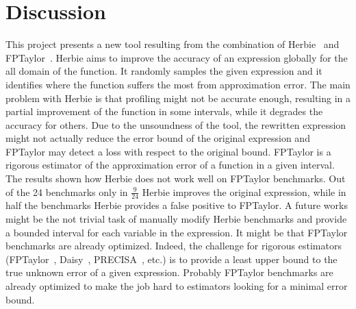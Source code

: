 \documentclass[runningheads]{llncs}
\begin{document}
\section{Discussion}
This project presents a new tool resulting from the combination of Herbie~\cite{herbie} and FPTaylor~\cite{fptaylor}. 
Herbie aims to improve the accuracy of an expression globally for the all domain of the function. It randomly samples the given expression and it identifies where the function suffers the most from approximation error. 
The main problem with Herbie is that profiling might not be accurate enough, resulting in a partial improvement of the function in some intervals, while it degrades the accuracy for others. Due to the unsoundness of the tool, the rewritten expression might not actually reduce the error bound of the original expression and FPTaylor may detect a loss with respect to the original bound. FPTaylor is a rigorous estimator of the approximation error of a function in a given interval.
The results shown how Herbie does not work well on FPTaylor benchmarks. Out of the 24 benchmarks only in $\frac{9}{24}$ Herbie improves the original expression, while in half the benchmarks Herbie provides a false positive to FPTaylor.
A future works might be the not trivial task of manually modify Herbie benchmarks and provide a bounded interval for each variable in the expression. 
It might be that FPTaylor benchmarks are already optimized. Indeed, the challenge for rigorous estimators (FPTaylor~\cite{fptaylor}, Daisy~\cite{Daisy}, PRECISA~\cite{precisa}, etc.) is to provide a least upper bound to the true unknown error of a given expression. Probably FPTaylor benchmarks are already optimized to make the job hard to estimators looking for a minimal error bound.

%
%


\end{document}
